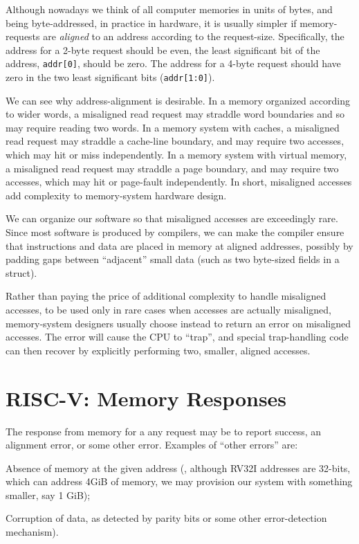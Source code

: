 Although nowadays we think of all computer memories in units of bytes,
and being byte-addressed, in practice in hardware, it is usually
simpler if memory-requests are \emph{aligned} to an address according
to the request-size.  Specifically, the address for a 2-byte request
should be even, {\ie} the least significant bit of the address,
\verb|addr[0]|, should be zero.  The address for a 4-byte request
should have zero in the two least significant bits (\verb|addr[1:0]|).

We can see why address-alignment is desirable.  In a memory organized
according to wider words, a misaligned read request may straddle word
boundaries and so may require reading two words.  In a memory system
with caches, a misaligned read request may straddle a cache-line
boundary, and may require two accesses, which may hit or miss
independently.  In a memory system with virtual memory, a misaligned
read request may straddle a page boundary, and may require two
accesses, which may hit or page-fault independently.  In short,
misaligned accesses add complexity to memory-system hardware design.

We can organize our software so that misaligned accesses are
exceedingly rare.  Since most software is produced by compilers, we
can make the compiler ensure that instructions and data are placed in
memory at aligned addresses, possibly by padding gaps between
``adjacent'' small data (such as two byte-sized fields in a struct).

Rather than paying the price of additional complexity to handle
misaligned accesses, to be used only in rare cases when accesses are
actually misaligned, memory-system designers usually choose instead to
return an error on misaligned accesses.  The error will cause the CPU
to ``trap'', and special trap-handling code can then recover by
explicitly performing two, smaller, aligned accesses.


\section{RISC-V: Memory Responses}


The response from memory for a any request may be to report success,
an alignment error, or some other error.  Examples of ``other errors''
are:

\begin{tightlist}

\item Absence of memory at the given address ({\eg}, although RV32I
  addresses are 32-bits, which can address 4GiB of memory, we may
  provision our system with something smaller, say 1 GiB);

\item Corruption of data, as detected by parity bits or some other
  error-detection mechanism).

\end{tightlist}

